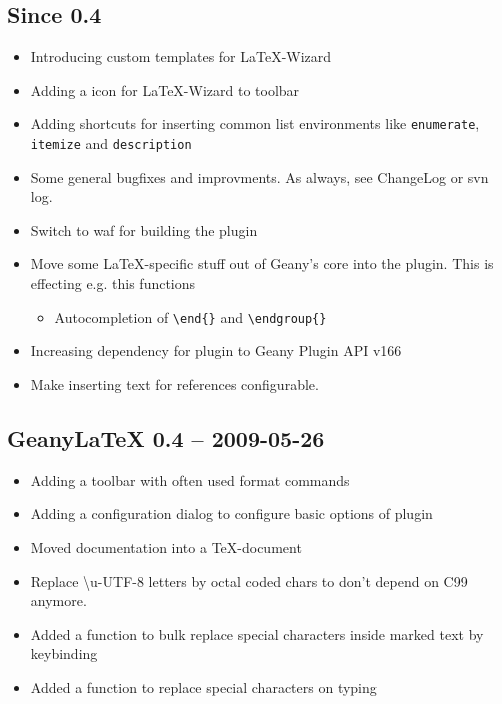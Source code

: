 \documentclass[%
paper=a4,%
fontsize=11pt,%
twoside=false,%
DIV18,
headsepline,
plainheadsepline,
footsepline,
plainfootsepline,
bibliography=totoc,%
listof=totoc,%
BCOR10mm,%
parskip=half,%
openany,%
]{scrartcl}
\begin{document}
\subsection*{Since 0.4}
\begin{itemize}

	\item Introducing custom templates for \LaTeX-Wizard
	\item Adding a icon for \LaTeX-Wizard to toolbar
	\item Adding shortcuts for inserting common list environments
		  like \texttt{enumerate}, \texttt{itemize} and
		  \texttt{description}
	\item Some general bugfixes and improvments. As always, see
		  ChangeLog or svn log.
	\item Switch to waf for building the plugin
	\item Move some \LaTeX{}-specific stuff out of Geany's core into the
		  plugin. This is effecting e.g. this functions
			\begin{itemize}
				\item Autocompletion of \texttt{\textbackslash{}end\{\}}
					and \texttt{\textbackslash{}endgroup\{\}}
			\end{itemize}
	\item Increasing dependency for plugin to Geany Plugin API v166
	\item Make inserting text for references configurable.
\end{itemize}

\subsection*{GeanyLaTeX{} 0.4 -- 2009-05-26}
\begin{itemize}
	\item Adding a toolbar with often used format commands
	\item Adding a configuration dialog to configure basic options
          of plugin
	\item Moved documentation into a \TeX{}-document
	\item Replace \textbackslash{}u-UTF-8 letters by octal coded
          chars to don't depend on C99 anymore.
	\item Added a function to bulk replace special characters
          inside marked text by keybinding
	\item Added a function to replace special characters on typing
\end{itemize}
\end{document}
